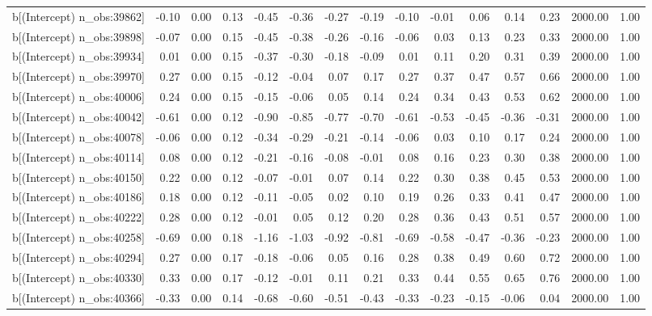 \begin{table}[ht]
\begin{tabular}{rrrrrrrrrrrrrrr}
  b[(Intercept) n\_obs:39862] & -0.10 & 0.00 & 0.13 & -0.45 & -0.36 & -0.27 & -0.19 & -0.10 & -0.01 & 0.06 & 0.14 & 0.23 & 2000.00 & 1.00 \\ 
  b[(Intercept) n\_obs:39898] & -0.07 & 0.00 & 0.15 & -0.45 & -0.38 & -0.26 & -0.16 & -0.06 & 0.03 & 0.13 & 0.23 & 0.33 & 2000.00 & 1.00 \\ 
  b[(Intercept) n\_obs:39934] & 0.01 & 0.00 & 0.15 & -0.37 & -0.30 & -0.18 & -0.09 & 0.01 & 0.11 & 0.20 & 0.31 & 0.39 & 2000.00 & 1.00 \\ 
  b[(Intercept) n\_obs:39970] & 0.27 & 0.00 & 0.15 & -0.12 & -0.04 & 0.07 & 0.17 & 0.27 & 0.37 & 0.47 & 0.57 & 0.66 & 2000.00 & 1.00 \\ 
  b[(Intercept) n\_obs:40006] & 0.24 & 0.00 & 0.15 & -0.15 & -0.06 & 0.05 & 0.14 & 0.24 & 0.34 & 0.43 & 0.53 & 0.62 & 2000.00 & 1.00 \\ 
  b[(Intercept) n\_obs:40042] & -0.61 & 0.00 & 0.12 & -0.90 & -0.85 & -0.77 & -0.70 & -0.61 & -0.53 & -0.45 & -0.36 & -0.31 & 2000.00 & 1.00 \\ 
  b[(Intercept) n\_obs:40078] & -0.06 & 0.00 & 0.12 & -0.34 & -0.29 & -0.21 & -0.14 & -0.06 & 0.03 & 0.10 & 0.17 & 0.24 & 2000.00 & 1.00 \\ 
  b[(Intercept) n\_obs:40114] & 0.08 & 0.00 & 0.12 & -0.21 & -0.16 & -0.08 & -0.01 & 0.08 & 0.16 & 0.23 & 0.30 & 0.38 & 2000.00 & 1.00 \\ 
  b[(Intercept) n\_obs:40150] & 0.22 & 0.00 & 0.12 & -0.07 & -0.01 & 0.07 & 0.14 & 0.22 & 0.30 & 0.38 & 0.45 & 0.53 & 2000.00 & 1.00 \\ 
  b[(Intercept) n\_obs:40186] & 0.18 & 0.00 & 0.12 & -0.11 & -0.05 & 0.02 & 0.10 & 0.19 & 0.26 & 0.33 & 0.41 & 0.47 & 2000.00 & 1.00 \\ 
  b[(Intercept) n\_obs:40222] & 0.28 & 0.00 & 0.12 & -0.01 & 0.05 & 0.12 & 0.20 & 0.28 & 0.36 & 0.43 & 0.51 & 0.57 & 2000.00 & 1.00 \\ 
  b[(Intercept) n\_obs:40258] & -0.69 & 0.00 & 0.18 & -1.16 & -1.03 & -0.92 & -0.81 & -0.69 & -0.58 & -0.47 & -0.36 & -0.23 & 2000.00 & 1.00 \\ 
  b[(Intercept) n\_obs:40294] & 0.27 & 0.00 & 0.17 & -0.18 & -0.06 & 0.05 & 0.16 & 0.28 & 0.38 & 0.49 & 0.60 & 0.72 & 2000.00 & 1.00 \\ 
  b[(Intercept) n\_obs:40330] & 0.33 & 0.00 & 0.17 & -0.12 & -0.01 & 0.11 & 0.21 & 0.33 & 0.44 & 0.55 & 0.65 & 0.76 & 2000.00 & 1.00 \\ 
  b[(Intercept) n\_obs:40366] & -0.33 & 0.00 & 0.14 & -0.68 & -0.60 & -0.51 & -0.43 & -0.33 & -0.23 & -0.15 & -0.06 & 0.04 & 2000.00 & 1.00 \\ 

\end{tabular}
\end{table}
